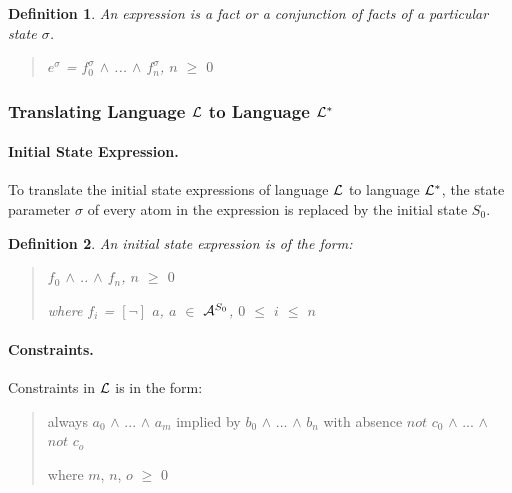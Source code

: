 \documentclass[10pt, twocolumn]{article}
\newtheorem{definition}{Definition}
\begin{document}
        \begin{definition}
          An expression is a fact or a conjunction of facts of a particular
          state $\sigma$.

          \begin{quote}
            $e^{\sigma}$ = $f^{\sigma}_{0}$ $\land$ ... $\land$ $f^{\sigma}_{n}$, $n$ $\geq$ $0$
          \end{quote}
        \end{definition}

      \subsubsection{Translating Language ${\cal L}$ to Language ${\cal L^{*}}$}

        \paragraph{Initial State Expression.}

          To translate the initial state expressions of language ${\cal L}$ to
          language ${\cal L}^{*}$, the state parameter $\sigma$ of every atom
          in the expression is replaced by the initial state $S_{0}$.

          \begin{definition}
            An initial state expression is of the form:

            \begin{quote}
              $f_{0}$ $\land$ .. $\land$ $f_{n}$, $n$ $\geq$ $0$

              where $f_{i}$ = $[\lnot]$ $a$, $a$ $\in$ ${\cal A}^{S_{0}}$, $0$ $\leq$ $i$ $\leq$ $n$
            \end{quote}

          \end{definition}

        \paragraph{Constraints.}

          Constraints in ${\cal L}$ is in the form:

          \begin{quote}
            always $a_{0}$ $\land$ ... $\land$ $a_{m}$
            implied by $b_{0}$ $\land$ ... $\land$ $b_{n}$
            with absence $not$ $c_{0}$ $\land$ ... $\land$ $not$ $c_{o}$

            where $m$, $n$, $o$ $\geq$ $0$
          \end{quote}
\end{document}
